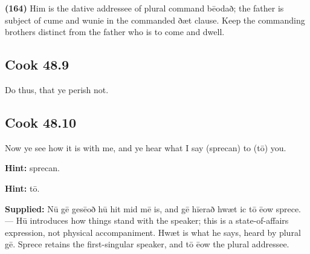 \textbf{(164)} Him is the dative addressee of plural command bēodað; the father is subject of cume and wunie in the commanded ðæt clause. Keep the commanding brothers distinct from the father who is to come and dwell.

\par\begin{minipage}{\linewidth}\raggedright
\subsection*{Cook 48.9}

Do thus, that ye perish not.

\end{minipage}\par\addvspace{4pt}

\par\begin{minipage}{\linewidth}\raggedright
\subsection*{Cook 48.10}

Now ye see how it is with me, and ye hear what I say (sprecan) to (tō) you.

\textbf{Hint:} sprecan.

\textbf{Hint:} tō.

\end{minipage}\par\addvspace{4pt}

\textbf{Supplied:} Nū gē gesēoð hū hit mid mē is, and gē hīerað hwæt ic tō ēow sprece. — Hū introduces how things stand with the speaker; this is a state-of-affairs expression, not physical accompaniment. Hwæt is what he says, heard by plural gē. Sprece retains the first-singular speaker, and tō ēow the plural addressee.

